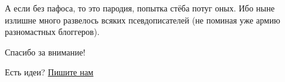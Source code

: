 \documentclass{ideas}
\begin{document}
 А если без пафоса, то это пародия, попытка стёба потуг оных. Ибо ныне излишне много развелось всяких псевдописателей (не поминая уже армию разномастных блоггеров).






\vspace*{\fill}
\begin{center}
    \large 
    Спасибо за внимание!

    \vspace{2em}
    Есть идеи?
    \href{mailto:anto-kha0@rambler.ru}{Пишите нам}
\end{center}
\vfill
\end{document}
